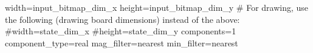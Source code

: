 width={{input_bitmap_dim_x}}
height={{input_bitmap_dim_y}}
# For drawing, use the following (drawing board dimensions) instead of the above:
#width={{state_dim_x}}
#height={{state_dim_y}}
components=1
component_type=real
mag_filter=nearest
min_filter=nearest
